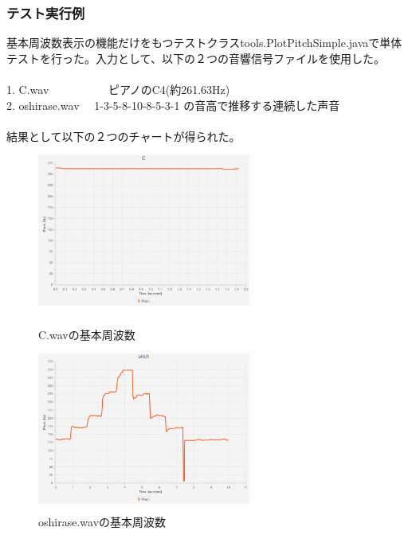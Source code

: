 \documentclass[a4j]{jarticle}
\begin{document}
\subsubsection{テスト実行例}
基本周波数表示の機能だけをもつテストクラスtools.PlotPitchSimple.javaで単体テストを行った。入力として、以下の２つの音響信号ファイルを使用した。\\
　\\
1. C.wav　　　　　 ピアノのC4(約261.63Hz)\\
2. oshirase.wav　  1-3-5-8-10-8-5-3-1 の音高で推移する連続した声音\\
　\\
結果として以下の２つのチャートが得られた。

\begin{figure}[htbp]
 \begin{minipage}{0.5\hsize}
  \begin{center}
   \includegraphics[width=70mm]{pitchC.eps}
  \end{center}
  \caption{C.wavの基本周波数}
  \label{fig:one}
 \end{minipage}
 \begin{minipage}{0.5\hsize}
  \begin{center}
   \includegraphics[width=70mm]{oshirasePitch.eps}
  \end{center}
  \caption{oshirase.wavの基本周波数}
  \label{fig:two}
 \end{minipage}
\end{figure}
\end{document}
